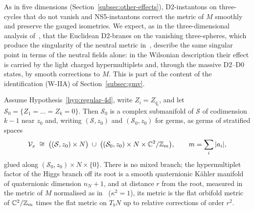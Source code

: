 As in five dimensions (Section~\ref{subsec:other-effects}), D2-instantons on three-cycles that do not
vanish and NS5-instantons correct the metric of $M$ smoothly and preserve the gauged isometries. We expect, as in
the three-dimensional analysis of~\cite{SeibergShenker:1996}, that the Euclidean D2-branes on the vanishing
three-spheres, which produce the singularity of the neutral metric in~\cite{OoguriVafa:1996}, describe the
same singular point in terms of the neutral fields alone: in the Wilsonian description their effect is
carried by the light charged hypermultiplets and, through the massive D2--D0 states, by smooth corrections
to $M$. This is part of the content of the identification (W-IIA) of Section~\ref{subsec:gmv}.

\begin{theorem}\label{thm:4d}
Assume Hypothesis~\ref{hyp:regular-4d}, write $Z_i=Z_{q_i}$, and let $\mathcal S_0=\{Z_1=\dots=Z_k=0\}$.
Then $\mathcal S_0$ is a complex submanifold of $\mathcal S$ of codimension $k-1$ near $z_0$ and, writing
$(\mathcal S,z_0)$ and $(\mathcal S_0,z_0)$ for germs, as germs of stratified spaces
\begin{equation}
 \mathcal V_x\;\cong\;\bigl((\mathcal S,z_0)\times N\bigr)\;\cup\;\bigl((\mathcal S_0,z_0)\times N\times\mathbb C^2/\mathbb Z_m\bigr),
 \qquad m=\sum_i|a_i|,
 \label{eq:thm-4d}
\end{equation}
glued along $(\mathcal S_0,z_0)\times N\times\{0\}$. There is no mixed branch; the hypermultiplet
factor of the Higgs branch off its root is a smooth quaternionic K\"ahler manifold of quaternionic
dimension $n_N+1$, and at distance $r$ from the root, measured in the metric of $M$ normalised as
in~\cite{Hristov:2009} ($\kappa^2=1$), its metric is the
flat orbifold metric of $\mathbb C^2/\mathbb Z_m$ times the flat metric on $T_bN$ up to relative corrections of order
$r^2$.
\end{theorem}

